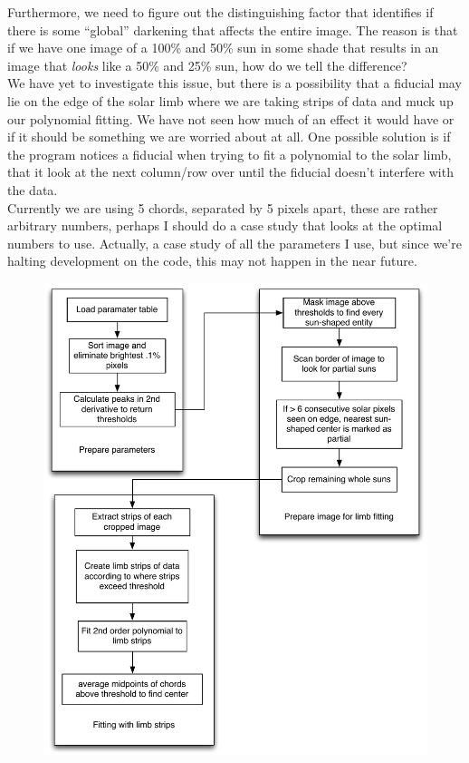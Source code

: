 \documentclass[10pt]{scrartcl}
\begin{document}
Furthermore, we need to figure out the distinguishing factor that identifies if there is some ``global'' darkening that affects the entire image. The reason is that if we have one image of a 100\% and 50\% sun in some shade that results in an image that \emph{looks} like a 50\% and 25\% sun, how do we tell the difference? \\

We have yet to investigate this issue, but there is a possibility that a fiducial may lie on the edge of the solar limb where we are taking strips of data and muck up our polynomial fitting. We have not seen how much of an effect it would have or if it should be something we are worried about at all. One possible solution is if the program notices a fiducial when trying to fit a polynomial to the solar limb, that it look at the next column/row over until the fiducial doesn't interfere with the data.\\

Currently we are using 5 chords, separated by 5 pixels apart, these are rather arbitrary numbers, perhaps I should do a case study that looks at the optimal numbers to use. Actually, a case study of all the parameters I use, but since we're halting development on the code, this may not happen in the near future. 


\begin{figure}[!ht]
    \centering
    \includegraphics[width=.9\textwidth]{../plots_tables_images/beta_flowchart.pdf}    
\end{figure}
\end{document}
